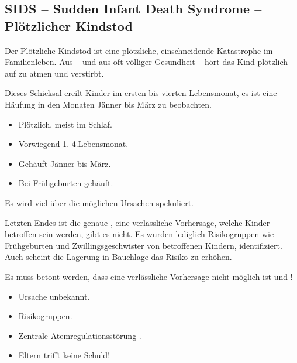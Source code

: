  
\subsection{SIDS -- Sudden Infant Death Syndrome -- Plötzlicher Kindstod}
\label{topic:sids}

{
Der Plötzliche Kindstod  ist eine plötzliche, einschneidende Katastrophe im
Familienleben. Aus  -- und aus oft völliger Gesundheit
-- hört das Kind plötzlich auf zu atmen und verstirbt. 

Dieses Schicksal ereilt Kinder im ersten bis vierten Lebensmonat, es ist eine
Häufung in den Monaten Jänner bis März zu beobachten.

}{
\begin{itemize}
    \item Plötzlich, meist im Schlaf.
    \item Vorwiegend 1.-4.Lebensmonat.
    \item Gehäuft Jänner bis März.
    \item Bei Frühgeburten gehäuft.
\end{itemize}
}{}{}{}


{
Es wird viel über die möglichen Ursachen spekuliert. 

Letzten Endes ist die genaue , eine
verlässliche Vorhersage, welche Kinder betroffen sein werden,
gibt es nicht. Es wurden lediglich Risikogruppen wie
Frühgeburten und Zwillingsgeschwister von betroffenen
Kindern, identifiziert. Auch scheint die Lagerung in
Bauchlage das Risiko zu erhöhen.

Es muss betont werden, dass eine verlässliche Vorhersage nicht möglich ist und
!

}{
\begin{itemize}
    \item Ursache unbekannt.
    \item Risikogruppen.
    \item Zentrale Atemregulationsstörung .
    \item Eltern trifft keine Schuld!
\end{itemize}
}{}{}{}


